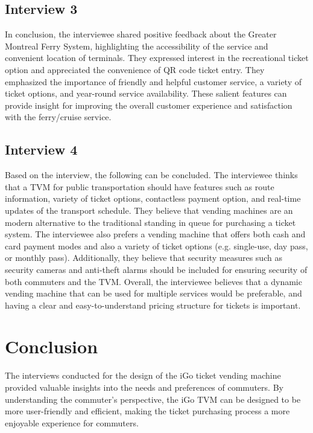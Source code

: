 \documentclass[letterpaper]{report}
\begin{document}
\subsection{Interview 3}
In conclusion, the interviewee shared positive feedback about the Greater Montreal Ferry System, highlighting the accessibility of the service and convenient location of terminals. They expressed interest in the recreational ticket option and appreciated the convenience of QR code ticket entry. They emphasized the importance of friendly and helpful customer service, a variety of ticket options, and year-round service availability. These salient features can provide insight for improving the overall customer experience and satisfaction with the ferry/cruise service.

\newpage
\subsection{Interview 4}
Based on the interview, the following can be concluded. The interviewee thinks that a TVM for public transportation should have features such as route information, variety of ticket options, contactless payment option, and real-time updates of the transport schedule. They believe that vending machines are an modern alternative to the traditional standing in queue for purchasing a ticket system. The interviewee also prefers a vending machine that offers both cash and card payment modes and also a variety of ticket options (e.g. single-use, day pass, or monthly pass). Additionally, they believe that security measures such as security cameras and anti-theft alarms should be included for ensuring security of both commuters and the TVM. Overall, the interviewee believes that a dynamic vending machine that can be used for multiple services would be preferable, and having a clear and easy-to-understand pricing structure for tickets is important.

\section{Conclusion}
The interviews conducted for the design of the iGo ticket vending machine provided valuable insights into the needs and preferences of commuters. By understanding the commuter's perspective, the iGo TVM can be designed to be more user-friendly and efficient, making the ticket purchasing process a more enjoyable experience for commuters.
\vspace{\baselineskip}
\end{document}
